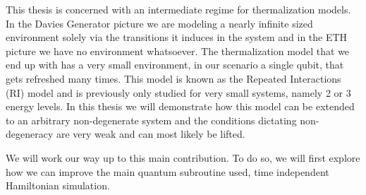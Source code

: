 This thesis is concerned with an intermediate regime for thermalization models. In the Davies Generator picture we are modeling a nearly infinite sized environment solely via the transitions it induces in the system and in the ETH picture we have no environment whatsoever. The thermalization model that we end up with has a very small environment, in our scenario a single qubit, that gets refreshed many times. This model is known as the Repeated Interactions (RI) model and is previously only studied for very small systems, namely 2 or 3 energy levels. In this thesis we will demonstrate how this model can be extended to an arbitrary non-degenerate system and the conditions dictating non-degeneracy are very weak and can most likely be lifted.

We will work our way up to this main contribution. To do so, we will first explore how we can improve the main quantum subroutine used, time independent Hamiltonian simulation.




